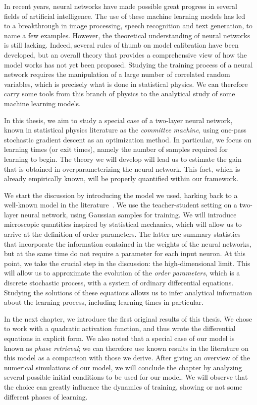 In recent years, neural networks have made possible great progress in several fields of artificial intelligence. 
The use of these machine learning models has led to a breakthrough in
image processing, speech recognition and text generation, to name a few examples.
However, the theoretical understanding of neural networks is still lacking.
Indeed, several rules of thumb on model calibration have been developed,
but an overall theory that provides a comprehensive view of how the model works has not yet been proposed.
Studying the training process of a neural network requires the manipulation of a large number of correlated random variables,
which is precisely what is done in statistical physics. We can therefore carry some tools
from this branch of physics to the analytical study of some machine learning models.

In this thesis, we aim to study a special case of a two-layer neural network,
known in statistical physics literature as the \emph{committee machine},
using one-pass stochastic gradient descent as an optimization method.
In particular, we focus on learning times (or exit times), namely
the number of samples required for learning to begin.
The theory we will develop will lead us to estimate the gain that is obtained in overparameterizing the neural network.
This fact, which is already empirically known, will be properly quantified within our framework.

We start the discussion by introducing the model we used, harking back to a well-known model in the literature~\cite{saad1995line}.
We use the teacher-student setting on a two-layer neural network, using Gaussian samples for training.
We will introduce microscopic quantities inspired by statistical mechanics,
which will allow us to arrive at the definition of order parameters.
The latter are summary statistics that incorporate the information contained in the weights of the neural networks,
but at the same time do not require a parameter for each input neuron.
At this point, we take the crucial step in the discussion: the high-dimensional limit.
This will allow us to approximate the evolution of the \emph{order parameters}, which is a discrete stochastic process, with a system of ordinary differential equations.
Studying the solutions of these equations allows us to infer analytical information about the learning process,
including learning times in particular.

In the next chapter, we introduce the first original results of this thesis.
We chose to work with a quadratic activation function, and thus wrote the differential equations in explicit form.
We also noted that a special case of our model is known as \emph{phase retrieval};
we can therefore use known results in the literature on this model as a comparison with those we derive.
After giving an overview of the numerical simulations of our model,
we will conclude the chapter by analyzing several possible initial conditions to be used for our model.
We will observe that the choice can greatly influence the dynamics of training,
showing or not some different phases of learning.

